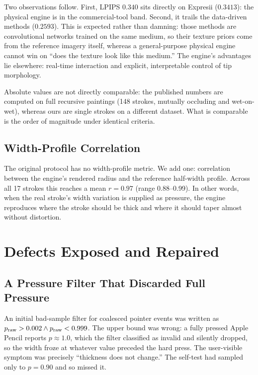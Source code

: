 \documentclass[conference]{IEEEtran}
\begin{document}
Two observations follow. First, LPIPS $0.340$ sits directly on Expresii
($0.3413$): the physical engine is in the commercial-tool band. Second, it
trails the data-driven methods ($0.2593$). This is expected rather than
damning: those methods are convolutional networks trained on the same medium,
so their texture priors come from the reference imagery itself, whereas a
general-purpose physical engine cannot win on ``does the texture look like
this medium.'' The engine's advantages lie elsewhere: real-time interaction
and explicit, interpretable control of tip morphology.

Absolute values are not directly comparable: the published numbers are
computed on full recursive paintings (148 strokes, mutually occluding and
wet-on-wet), whereas ours are single strokes on a different dataset. What is
comparable is the order of magnitude under identical criteria.

\subsection{Width-Profile Correlation}

The original protocol has no width-profile metric. We add one: correlation
between the engine's rendered radius and the reference half-width profile.
Across all 17 strokes this reaches a mean $r=0.97$ (range 0.88--0.99). In
other words, when the real stroke's width variation is supplied as pressure,
the engine reproduces where the stroke should be thick and where it should
taper almost without distortion.

\section{Defects Exposed and Repaired}
\label{sec:defects}

\subsection{A Pressure Filter That Discarded Full Pressure}

An initial bad-sample filter for coalesced pointer events was written as
$p_{\rm raw}>0.002 \wedge p_{\rm raw}<0.999$. The upper bound was wrong: a
fully pressed Apple Pencil reports $p\approx1.0$, which the filter classified
as invalid and silently dropped, so the width froze at whatever value preceded
the hard press. The user-visible symptom was precisely ``thickness does not
change.'' The self-test had sampled only to $p=0.90$ and so missed it.
\end{document}

